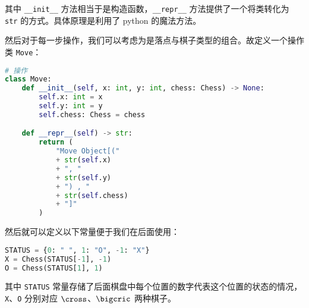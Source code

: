 其中 \verb`__init__` 方法相当于是构造函数，\verb`__repr__` 方法提供了一个将类转化为 \verb`str` 的方式。具体原理是利用了 python 的魔法方法。

然后对于每一步操作，我们可以考虑为是落点与棋子类型的组合。故定义一个操作类 \verb`Move`：
\begin{lstlisting}[language=python]
# 操作
class Move:
    def __init__(self, x: int, y: int, chess: Chess) -> None:
        self.x: int = x
        self.y: int = y
        self.chess: Chess = chess

    def __repr__(self) -> str:
        return (
            "Move Object[("
            + str(self.x)
            + ", "
            + str(self.y)
            + ") , "
            + str(self.chess)
            + "]"
        )
\end{lstlisting}
然后就可以定义以下常量便于我们在后面使用：
\begin{lstlisting}[language=python]
STATUS = {0: " ", 1: "O", -1: "X"}
X = Chess(STATUS[-1], -1)
O = Chess(STATUS[1], 1)
\end{lstlisting}
其中 \verb`STATUS` 常量存储了后面棋盘中每个位置的数字代表这个位置的状态的情况，\verb`X`、\verb`O` 分别对应 $\cross$、$\bigcric$ 两种棋子。